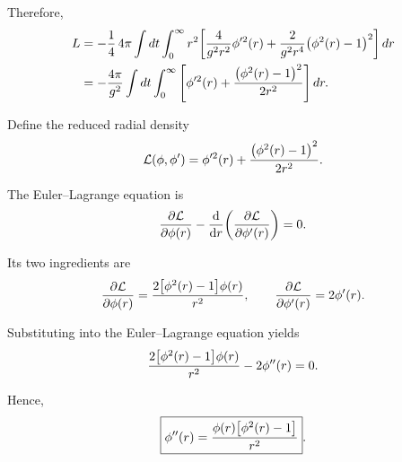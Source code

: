\documentclass[12pt, a4paper]{article}
\begin{document}
Therefore,
\[
\begin{aligned}
L
&=
-\frac{1}{4}\,4\pi \int dt \int_0^\infty
r^2 \qty[
\frac{4}{g^2 r^2}\phi'^2(r)
+ \frac{2}{g^2 r^4}\qty(\phi^2(r)-1)^2
]\,dr \\
&=
-\frac{4\pi}{g^2} \int dt \int_0^\infty
\qty[
\phi'^2(r)
+ \frac{\qty(\phi^2(r)-1)^2}{2r^2}
]\,dr.
\end{aligned}
\]

Define the reduced radial density
\[
\mathcal{L}(\phi,\phi')
=
\phi'^2(r) + \frac{\qty(\phi^2(r)-1)^2}{2r^2}.
\]

The Euler--Lagrange equation is
\[
\pdv{\mathcal{L}}{\phi(r)} - \dv{r}\qty(\pdv{\mathcal{L}}{\phi'(r)}) = 0.
\]

Its two ingredients are
\[
\pdv{\mathcal{L}}{\phi(r)}
=
\frac{2\qty[\phi^2(r)-1]\phi(r)}{r^2},
\qquad
\pdv{\mathcal{L}}{\phi'(r)}
=
2\phi'(r).
\]

Substituting into the Euler--Lagrange equation yields
\[
\frac{2\qty[\phi^2(r)-1]\phi(r)}{r^2} - 2\phi''(r) = 0.
\]

Hence,
\[
\boxed{
\phi''(r) = \frac{\phi(r)\qty[\phi^2(r)-1]}{r^2}
}.
\]
\end{document}
